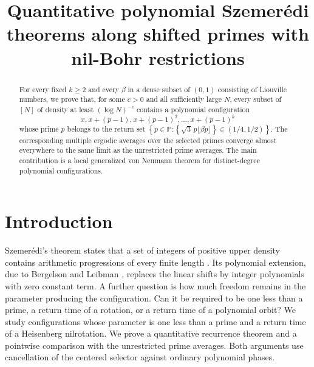 \documentclass[12pt]{amsart}
\title{Quantitative polynomial Szemer\'edi theorems along shifted
primes with nil-Bohr restrictions}
\author{}
\date{}
\newcommand{\1}{\mathbf 1}
\theoremstyle{definition}
\begin{document}
\begin{abstract}
For every fixed \(k\geq 2\) and every \(\beta\) in a dense subset
of \((0,1)\) consisting of Liouville numbers, we prove that, for
some \(c>0\) and all sufficiently large \(N\), every subset of
\([N]\) of density at least \((\log N)^{-c}\) contains a polynomial
configuration 
$$x,x+(p-1),x+(p-1)^2,\ldots,x+(p-1)^k$$ 
whose prime \(p\)
belongs to  the return set
\(
 \left\{p\in\mathbb P:
 \left\{\sqrt{3}\,p\lfloor\beta p\rfloor\right\}
 \in (1/4,1/2)\right\}.
\)
The corresponding multiple ergodic averages over the selected
primes converge almost everywhere to the same limit as the
unrestricted prime averages. The main contribution is a local
generalized von Neumann theorem for distinct-degree polynomial
configurations. 
\end{abstract}
\maketitle
\pagestyle{plain}

\tableofcontents

\section{Introduction}
\label{s:introduction}

Szemer\'edi's theorem states that a set of integers of positive upper
density contains arithmetic progressions of every finite length
\cite{Szemeredi}. Its polynomial extension, due to Bergelson and Leibman
\cite{BergelsonLeibman}, replaces the linear shifts by integer polynomials
with zero constant term. A further question is how much freedom remains
in the parameter producing the configuration. Can it be required to be
one less than a prime, a return time of a rotation, or a return time of a
polynomial orbit? We study configurations whose parameter is one less
than a prime and a return time of a Heisenberg nilrotation. We prove a
quantitative recurrence theorem and a pointwise comparison with the
unrestricted prime averages. Both arguments use cancellation of the
centered selector against ordinary polynomial phases.
\end{document}
